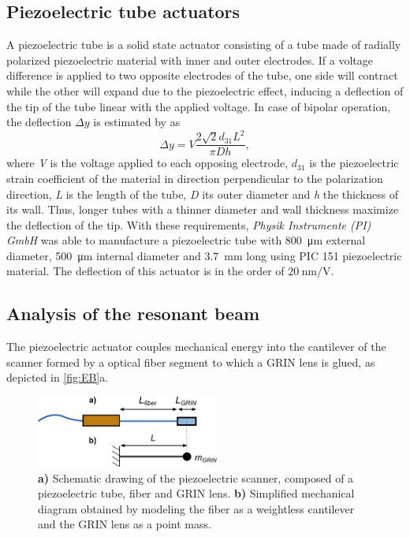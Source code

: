 \documentclass[10pt]{iopart}
\begin{document}
\subsection{Piezoelectric tube actuators}
\label{ssec:piezo}
A piezoelectric tube is a solid state actuator consisting of a tube made of radially polarized piezoelectric material with inner and outer electrodes. If a voltage difference is applied to two opposite electrodes of the tube, one side will contract while the other will expand due to the piezoelectric effect, inducing a deflection of the tip of the tube linear with the applied voltage. In case of bipolar operation, the deflection $\Delta y$ is estimated by \cite{Chen} as
\begin{equation}
\Delta y = V  \frac{2 \sqrt{2} d_{31} L^2}{\pi D h},
\end{equation}
where \textit{V} is the voltage applied to each opposing electrode, $d_{31}$ is the piezoelectric strain coefficient of the material in direction perpendicular to the polarization direction, \textit{L} is the length of the tube, \textit{D} its outer diameter and \textit{h} the thickness of its wall. Thus, longer tubes with a thinner diameter and wall thickness maximize the deflection of the tip. With these requirements, \textit{Physik Instrumente (PI) GmbH} was able to manufacture a piezoelectric tube with \SI{800}{\micro\meter} external diameter, \SI{500}{\micro\meter} internal diameter and \SI{3.7}{\milli\meter} long using PIC 151 piezoelectric material. The deflection of this actuator is in the order of $\SI{20}{\nano\meter / \volt}$.

\subsection{Analysis of the resonant beam}
\label{ssec:EB}
The piezoelectric actuator couples mechanical energy into the cantilever of the scanner formed by a optical fiber segment to which a GRIN lens is glued, as depicted in \autoref{fig:EB}a.

\begin{figure}[h!]\centering
      \includegraphics[width=6cm]{figures/EB.pdf}
      \caption{\textbf{a)} Schematic drawing of the piezoelectric scanner, composed of a piezoelectric tube, fiber and GRIN lens. 
      \textbf{b)} Simplified mechanical diagram obtained by modeling the fiber as a weightless cantilever and the GRIN lens as a point mass.}
      \label{fig:EB}
\end{figure}
\end{document}
